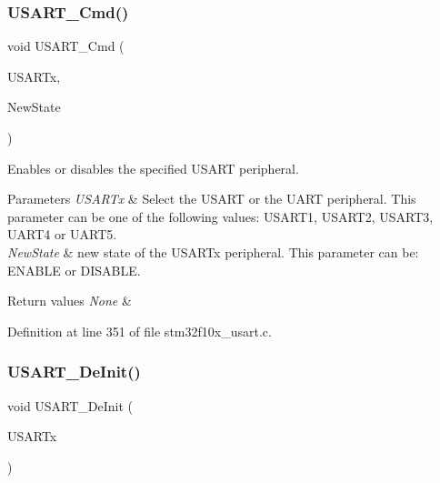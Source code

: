 \subsubsection{\texorpdfstring{U\+S\+A\+R\+T\+\_\+\+Cmd()}{USART\_Cmd()}}
{\footnotesize\ttfamily void U\+S\+A\+R\+T\+\_\+\+Cmd (\begin{DoxyParamCaption}\item[{\hyperlink{struct_u_s_a_r_t___type_def}{U\+S\+A\+R\+T\+\_\+\+Type\+Def} $\ast$}]{U\+S\+A\+R\+Tx,  }\item[{\hyperlink{group___exported__types_gac9a7e9a35d2513ec15c3b537aaa4fba1}{Functional\+State}}]{New\+State }\end{DoxyParamCaption})}



Enables or disables the specified U\+S\+A\+RT peripheral. 


\begin{DoxyParams}{Parameters}
{\em U\+S\+A\+R\+Tx} & Select the U\+S\+A\+RT or the U\+A\+RT peripheral. This parameter can be one of the following values\+: U\+S\+A\+R\+T1, U\+S\+A\+R\+T2, U\+S\+A\+R\+T3, U\+A\+R\+T4 or U\+A\+R\+T5. \\
\hline
{\em New\+State} & new state of the U\+S\+A\+R\+Tx peripheral. This parameter can be\+: E\+N\+A\+B\+LE or D\+I\+S\+A\+B\+LE. \\
\hline
\end{DoxyParams}

\begin{DoxyRetVals}{Return values}
{\em None} & \\
\hline
\end{DoxyRetVals}


Definition at line 351 of file stm32f10x\+\_\+usart.\+c.

\mbox{\label{group___u_s_a_r_t___private___functions_ga2f8e1ce72da21b6539d8e1f299ec3b0d}} 
\subsubsection{\texorpdfstring{U\+S\+A\+R\+T\+\_\+\+De\+Init()}{USART\_DeInit()}}
{\footnotesize\ttfamily void U\+S\+A\+R\+T\+\_\+\+De\+Init (\begin{DoxyParamCaption}\item[{\hyperlink{struct_u_s_a_r_t___type_def}{U\+S\+A\+R\+T\+\_\+\+Type\+Def} $\ast$}]{U\+S\+A\+R\+Tx }\end{DoxyParamCaption})}



